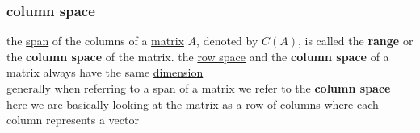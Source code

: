 \documentclass[a4paper,12pt]{article}
\begin{document}
\subsubsection{column space}
\label{sec:org05b7955}
\begin{definition}
the \hyperref[sec:org1ee137f]{span} of the columns of a \hyperref[sec:org2833a15]{matrix} \(A\), denoted by \(C(A)\), is called the \textbf{range} or the \textbf{column space} of the matrix. the \hyperref[sec:orged0dce5]{row space} and the \textbf{column space} of a matrix always have the same \hyperref[sec:orgdef24d1]{dimension}\\
generally when referring to a span of a matrix we refer to the \textbf{column space}\\
here we are basically looking at the matrix as a row of columns where each column represents a vector\\

\begin{center}

\end{center}


\end{definition}
\end{document}
